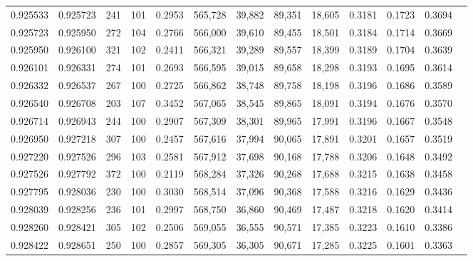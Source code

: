 \begin{tabular}{rrrrrrrrrrrrr}
0.925533 & 0.925723 &   241 & 101 &                                     0.2953 & 565,728 &  39,882 &  89,351 &  18,605 & 0.3181 & 0.1723 & 0.3694 \\
0.925723 & 0.925950 &   272 & 104 &                                     0.2766 & 566,000 &  39,610 &  89,455 &  18,501 & 0.3184 & 0.1714 & 0.3669 \\
0.925950 & 0.926100 &   321 & 102 &                                     0.2411 & 566,321 &  39,289 &  89,557 &  18,399 & 0.3189 & 0.1704 & 0.3639 \\
0.926101 & 0.926331 &   274 & 101 &                                     0.2693 & 566,595 &  39,015 &  89,658 &  18,298 & 0.3193 & 0.1695 & 0.3614 \\
0.926332 & 0.926537 &   267 & 100 &                                     0.2725 & 566,862 &  38,748 &  89,758 &  18,198 & 0.3196 & 0.1686 & 0.3589 \\
0.926540 & 0.926708 &   203 & 107 &                                     0.3452 & 567,065 &  38,545 &  89,865 &  18,091 & 0.3194 & 0.1676 & 0.3570 \\
0.926714 & 0.926943 &   244 & 100 &                                     0.2907 & 567,309 &  38,301 &  89,965 &  17,991 & 0.3196 & 0.1667 & 0.3548 \\
0.926950 & 0.927218 &   307 & 100 &                                     0.2457 & 567,616 &  37,994 &  90,065 &  17,891 & 0.3201 & 0.1657 & 0.3519 \\
0.927220 & 0.927526 &   296 & 103 &                                     0.2581 & 567,912 &  37,698 &  90,168 &  17,788 & 0.3206 & 0.1648 & 0.3492 \\
0.927526 & 0.927792 &   372 & 100 &                                     0.2119 & 568,284 &  37,326 &  90,268 &  17,688 & 0.3215 & 0.1638 & 0.3458 \\
0.927795 & 0.928036 &   230 & 100 &                                     0.3030 & 568,514 &  37,096 &  90,368 &  17,588 & 0.3216 & 0.1629 & 0.3436 \\
0.928039 & 0.928256 &   236 & 101 &                                     0.2997 & 568,750 &  36,860 &  90,469 &  17,487 & 0.3218 & 0.1620 & 0.3414 \\
0.928260 & 0.928421 &   305 & 102 &                                     0.2506 & 569,055 &  36,555 &  90,571 &  17,385 & 0.3223 & 0.1610 & 0.3386 \\
0.928422 & 0.928651 &   250 & 100 &                                     0.2857 & 569,305 &  36,305 &  90,671 &  17,285 & 0.3225 & 0.1601 & 0.3363 \\

\end{tabular}
